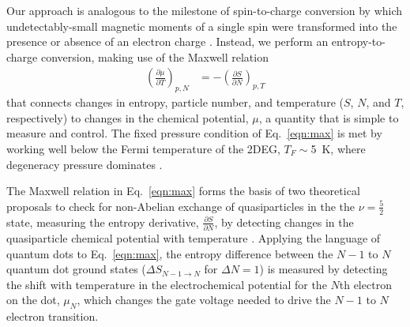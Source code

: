 \documentclass[twocolumn,showpacs,preprintnumbers,amsmath,amssymb,pra,aps,superscriptaddress]{revtex4-1}
\begin{document}
Our approach is analogous to the milestone of spin-to-charge conversion by which undetectably-small magnetic moments of a single spin were transformed into the presence or absence of an electron charge \cite{Elzerman2004, Ono2004}.  Instead, we perform an entropy-to-charge conversion, making use of the Maxwell relation
%
\begin{align}
\label{eqn:max}
        \left(\frac{\partial \mu}{\partial T}\right)_{p,N} &= -\left(\frac{\partial S}{\partial N}\right)_{p,T}
\end{align}
%
that connects changes in entropy, particle number, and temperature ($S$, $N$, and $T$, respectively) to changes in the chemical potential, $\mu$, a quantity that is simple to measure and control. The fixed pressure condition of Eq.~\ref{eqn:max} is met by working well below the Fermi temperature of the 2DEG, $T_F \sim$\SI{5}{\kelvin}, where degeneracy pressure dominates \cite{Landau1969}.

The Maxwell relation in Eq.~\ref{eqn:max} forms the basis of two theoretical proposals to check for non-Abelian exchange of quasiparticles in the the $\nu = \frac{5}{2}$ state, measuring the entropy derivative, $\frac{\partial S}{\partial N}$, by detecting changes in the quasiparticle chemical potential with temperature \cite{Cooper2009,Ben-Shach2013}.
Applying the language of quantum dots to Eq.~\ref{eqn:max}, the entropy difference between the $N-1$ to $N$ quantum dot ground states ($\Delta S_{N-1\rightarrow N}$ for $\Delta N=1$) is measured by detecting the shift with temperature in the electrochemical potential for the $N$th electron on the dot, $\mu_N$, which changes the gate voltage needed to drive the $N-1$ to $N$ electron transition.
\end{document}
